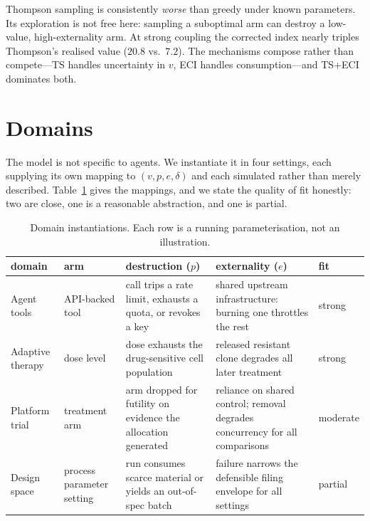 Thompson sampling is consistently \emph{worse} than greedy under known parameters.
Its exploration is not free here: sampling a suboptimal arm can destroy a
low-value, high-externality arm. At strong coupling the corrected index nearly
triples Thompson's realised value ($20.8$ vs.\ $7.2$). The mechanisms compose
rather than compete---TS handles uncertainty in $v$, ECI handles consumption---and
TS+ECI dominates both.

\section{Domains}
\label{sec:domains}

The model is not specific to agents. We instantiate it in four settings, each
supplying its own mapping to $(v,p,e,\delta)$ and each simulated rather than
merely described. Table~\ref{tab:domains} gives the mappings, and we state the
quality of fit honestly: two are close, one is a reasonable abstraction, and one is
partial.

\begin{table}[t]
\centering
\small
\caption{Domain instantiations. Each row is a running parameterisation, not an
illustration.}
\label{tab:domains}
\begin{tabular}{p{2.0cm}p{2.4cm}p{3.0cm}p{3.4cm}p{1.4cm}}
\toprule
domain & arm & destruction ($p$) & externality ($e$) & fit \\
\midrule
Agent tools & API-backed tool & call trips a rate limit, exhausts a quota, or
revokes a key & shared upstream infrastructure: burning one throttles the rest &
strong \\[2pt]
Adaptive therapy & dose level & dose exhausts the drug-sensitive cell population &
released resistant clone degrades all later treatment & strong \\[2pt]
Platform trial & treatment arm & arm dropped for futility on evidence the
allocation generated & reliance on shared control; removal degrades concurrency for
all comparisons & moderate \\[2pt]
Design space & process parameter setting & run consumes scarce material or yields
an out-of-spec batch & failure narrows the defensible filing envelope for all
settings & partial \\
\bottomrule
\end{tabular}
\end{table}

